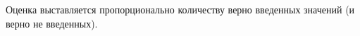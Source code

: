 \markSection

Оценка выставляется пропорционально количеству верно введенных значений (и верно не введенных). 



